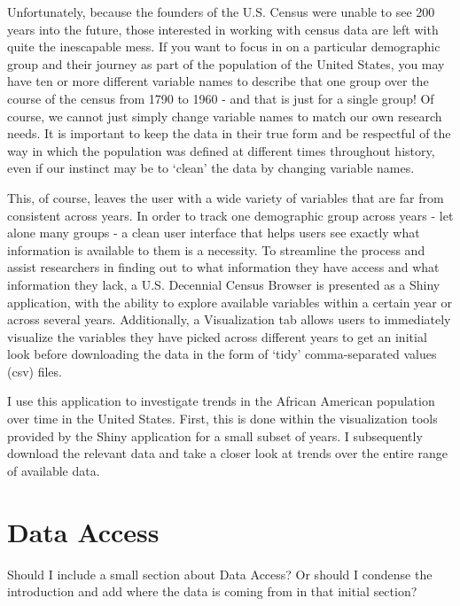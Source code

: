 \documentclass[DIV=calc, paper=a4, fontsize=10pt, twocolumn]{scrartcl}\usepackage[]{graphicx}\usepackage[]{color}
\begin{document}
\par Unfortunately, because the founders of the U.S. Census were unable to see 200 years into the future, those interested in working with census data are left with quite the inescapable mess. If you want to focus in on a particular demographic group and their journey as part of the population of the United States, you may have ten or more different variable names to describe that one group over the course of the census from 1790 to 1960 - and that is just for a single group! Of course, we cannot just simply change variable names to match our own research needs. It is important to keep the data in their true form and be respectful of the way in which the population was defined at different times throughout history, even if our instinct may be to `clean' the data by changing variable names.  

\par This, of course, leaves the user with a wide variety of variables that are far from consistent across years. In order to track one demographic group across years - let alone many groups - a clean user interface that helps users see exactly what information is available to them is a necessity. To streamline the process and assist researchers in finding out to what information they have access and what information they lack, a U.S. Decennial Census Browser is presented as a Shiny application, with the ability to explore available variables within a certain year or across several years. Additionally, a Visualization tab allows users to immediately visualize the variables they have picked across different years to get an initial look before downloading the data in the form of `tidy' comma-separated values (csv) files.  

\par I use this application to investigate trends in the African American population over time in the United States. First, this is done within the visualization tools provided by the Shiny application for a small subset of years. I subsequently download the relevant data and take a closer look at trends over the entire range of available data.  


\section*{Data Access}

Should I include a small section about Data Access? Or should I condense the introduction and add where the data is coming from in that initial section?  
\end{document}
